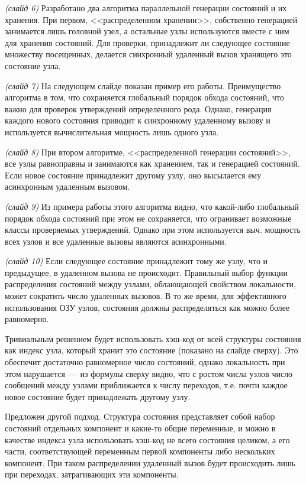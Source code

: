 \documentclass[a4paper,12pt,notitlepage]{article}
\begin{document}
\emph{(слайд 6)} Разработано два алгоритма параллельной генерации состояний и их
хранения. При первом, <<распределенном хранении>>, собственно генерацией занимается лишь
головной узел, а остальные узлы используются вместе с ним для хранения состояний. Для
проверки, принадлежит ли следующее состояние множеству посещенных, делается синхронный
удаленный вызов хранящего это состояние узла.

\emph{(слайд 7)} На следующем слайде показан пример его работы. Преимущество алгоритма в
том, что сохраняется глобальный порядок обхода состояний, что важно для проверок
утверждений определенного рода. Однако, генерация каждого нового состояния приводит к
синхронному удаленному вызову и используется вычислительная мощность лишь одного узла.

\emph{(слайд 8)} При втором алгоритме, <<распределенной генерации состояний>>, все узлы
равноправны и занимаются как хранением, так и генерацией состояний. Если новое состояние
принадлежит другому узлу, оно высылается ему асинхронным удаленным вызовом. 

\emph{(слайд 9)} Из примера работы этого алгоритма видно, что какой-либо глобальный
порядок обхода состояний при этом не сохраняется, что огранивает возможные классы
проверяемых утверждений. Однако при этом используется выч. мощность всех узлов и все
удаленные вызовы являются асинхронными.

\emph{(слайд 10)} Если следующее состояние принадлежит тому же узлу, что и предыдущее, в
удаленном вызова не происходит. Правильный выбор функции распределения состояний между
узлами, облающающей свойством локальности, может сократить число удаленных вызовов. В то
же время, для эффективного использования ОЗУ узлов, состояния должны распределяться как
можно более равномерно.

Тривиальным решением будет использовать хэш-код от всей структуры состояния как индекс
узла, который хранит это состояние (показано на слайде сверху). Это обеспечит достаточно
равномерное число состояний, однако локальность при этом нарушается~--- из формулы сверху
видно, что с ростом числа узлов число сообщений между узлами приближается к числу
переходов, т.е. почти каждое новое состояние будет принадлежать другому узлу.

Предложен другой подход. Структура состояния представляет собой набор состояний отдельных
компонент и какие-то общие переменные, и можно в качестве индекса узла использовать
хэш-код не всего состояния целиком, а его части, соответствующей переменным первой
компоненты либо нескольких компонент. При таком распределении удаленный вызов будет
происходить лишь при переходах, затрагивающих эти компоненты.
\end{document}
